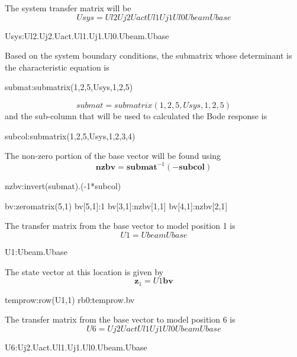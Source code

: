 \documentclass[12pt]{article}
\newcommand{\M}[1]{\mathbf{#1}}
\begin{document}
The system transfer matrix will be
\begin{equation}
	Usys=Ul2 Uj2 Uact Ul1 Uj1 Ul0 Ubeam Ubase
\end{equation}
\begin{maxima-noout}
	Usys:Ul2.Uj2.Uact.Ul1.Uj1.Ul0.Ubeam.Ubase
\end{maxima-noout}
Based on the system boundary conditions, the submatrix whose determinant is the characteristic equation is
\begin{maxima-noout}
	submat:submatrix(1,2,5,Usys,1,2,5)
\end{maxima-noout}
\begin{equation}
	submat=submatrix(1,2,5,Usys,1,2,5)
\end{equation}
and the sub-column that will be used to calculated the Bode response is
\begin{maxima}
	\parseopts{lhs='\M{subcol}',wrap=0}
	subcol:submatrix(1,2,5,Usys,1,2,3,4)
\end{maxima}
The non-zero portion of the base vector will be found using
\begin{equation}
\M{nzbv}=\M{submat}^{-1}\left(-\M{subcol}\right)
\end{equation}
\begin{maxima-noout}
	nzbv:invert(submat).(-1*subcol)
\end{maxima-noout}
\begin{maxima-noout}
bv:zeromatrix(5,1)
bv[5,1]:1
bv[3,1]:nzbv[1,1]
bv[4,1]:nzbv[2,1]
\end{maxima-noout}
The transfer matrix from the base vector to model position 1 is
\begin{equation}
	U1=Ubeam Ubase
\end{equation}
\begin{maxima-noout}
	U1:Ubeam.Ubase
\end{maxima-noout}
The state vector at this location is given by
\begin{equation}
	\M{z}_{1}=U1 \M{bv}
\end{equation}
\begin{maxima-noout}
	temprow:row(U1,1)
	rb0:temprow.bv
\end{maxima-noout}
The transfer matrix from the base vector to model position 6 is
\begin{equation}
	U6=Uj2 Uact Ul1 Uj1 Ul0 Ubeam Ubase
\end{equation}
\begin{maxima-noout}
	U6:Uj2.Uact.Ul1.Uj1.Ul0.Ubeam.Ubase
\end{maxima-noout}
\end{document}

